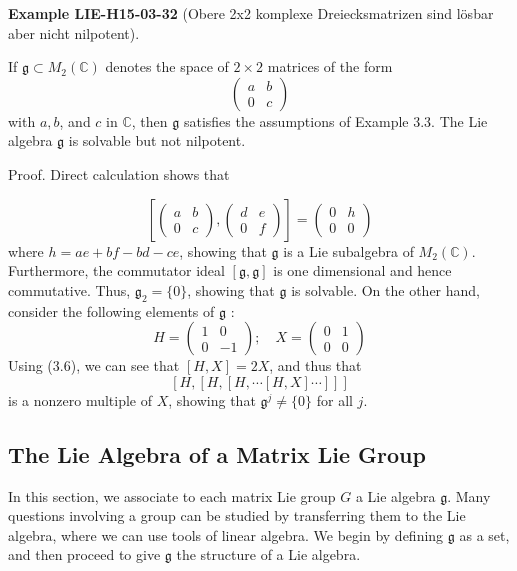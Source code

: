 \documentclass[10pt, letterpaper]{article}
\newcommand{\CustomHeading}[3]{%
  \par\medskip\noindent%
  \textbf{#1 #2} \textnormal{(#3)}.\enskip%
}
\newenvironment{EXA}[2]{\begin{unitbox}\CustomHeading{Example}{#1}{#2}}{\end{unitbox}}
\begin{document}
\begin{EXA}{LIE-H15-03-32}{Obere 2x2 komplexe Dreiecksmatrizen sind lösbar aber nicht nilpotent}
If $\mathfrak{g} \subset M_{2}(\mathbb{C})$ denotes the space of $2 \times 2$ matrices of the form
$$
\left(\begin{array}{ll}
a & b \\
0 & c
\end{array}\right)
$$
with $a, b$, and $c$ in $\mathbb{C}$, then $\mathfrak{g}$ satisfies the assumptions of Example 3.3. The Lie algebra $\mathfrak{g}$ is solvable but not nilpotent.

Proof. Direct calculation shows that

$$
\left[\left(\begin{array}{ll}
a & b \\
0 & c
\end{array}\right),\left(\begin{array}{ll}
d & e \\
0 & f
\end{array}\right)\right]=\left(\begin{array}{ll}
0 & h \\
0 & 0
\end{array}\right)
$$
where $h=a e+b f-b d-c e$, showing that $\mathfrak{g}$ is a Lie subalgebra of $M_{2}(\mathbb{C})$. Furthermore, the commutator ideal $[\mathfrak{g}, \mathfrak{g}]$ is one dimensional and hence commutative. Thus, $\mathfrak{g}_{2}=\{0\}$, showing that $\mathfrak{g}$ is solvable. On the other hand, consider the following elements of $\mathfrak{g}$ :
$$
H=\left(\begin{array}{rr}
1 & 0 \\
0 & -1
\end{array}\right) ; \quad X=\left(\begin{array}{ll}
0 & 1 \\
0 & 0
\end{array}\right)
$$
Using (3.6), we can see that $[H, X]=2 X$, and thus that
$$
[H,[H,[H, \cdots[H, X] \cdots]]]
$$
is a nonzero multiple of $X$, showing that $\mathfrak{g}^{j} \neq\{0\}$ for all $j$.
\end{EXA}

\subsection*{The Lie Algebra of a Matrix Lie Group}
In this section, we associate to each matrix Lie group $G$ a Lie algebra $\mathfrak{g}$. Many questions involving a group can be studied by transferring them to the Lie algebra, where we can use tools of linear algebra. We begin by defining $\mathfrak{g}$ as a set, and then proceed to give $\mathfrak{g}$ the structure of a Lie algebra.
\end{document}
